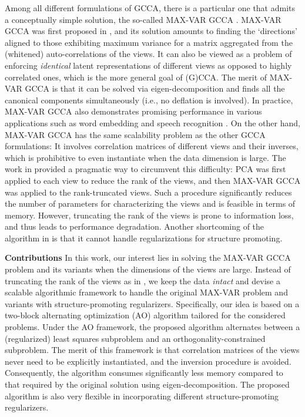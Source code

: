 \documentclass[10pt,journal]{IEEEtran}
\begin{document}
Among all different formulations of GCCA, there is a particular one that admits a conceptually simple solution, the so-called MAX-VAR GCCA \cite{carroll1968generalization,van2006generalized,kettenring1971canonical}.
MAX-VAR GCCA was first proposed in \cite{carroll1968generalization}, and its solution amounts to finding the `directions' aligned to those exhibiting maximum variance for a matrix aggregated from the (whitened) auto-correlations of the views.
It can also be viewed as a problem of enforcing {\em identical} latent representations of different views as opposed to highly correlated ones, which is the more general goal of (G)CCA.
The merit of MAX-VAR GCCA is that it can be solved via eigen-decomposition
and finds all the canonical components simultaneously (i.e., no deflation is involved).
In practice, MAX-VAR GCCA also demonstrates promising performance in various applications such as word embedding \cite{rastogimultiview} and speech recognition \cite{arora2014multi}.
On the other hand, MAX-VAR GCCA has the same scalability problem as the other GCCA formulations:
It involves correlation matrices of different views and their inverses, which is prohibitive to even instantiate when the data dimension is large.
The work in \cite{rastogimultiview} provided a pragmatic way to circumvent this difficulty: PCA was first applied to each view to reduce the rank of the views,
and then MAX-VAR GCCA was applied to the rank-truncated views. Such a procedure significantly reduces
the number of parameters for characterizing the views and is feasible in terms of memory. However, truncating the rank of the views is prone to information loss, and thus leads to performance degradation.
Another shortcoming of the algorithm in \cite{rastogimultiview} is that it cannot handle regularizations for structure promoting.

\bigskip

\noindent
{\bf Contributions}
In this work, our interest lies in solving the MAX-VAR GCCA problem and its variants when the dimensions of the views are large.
Instead of truncating the rank of the views as in \cite{rastogimultiview}, we keep the data \emph{intact} and devise a scalable algorithmic framework to handle the original MAX-VAR problem
and variants with structure-promoting regularizers.
Specifically, our idea is based on a two-block alternating optimization (AO) algorithm tailored for the considered problems.
Under the AO framework, the proposed algorithm alternates between a (regularized) least squares subproblem and an orthogonality-constrained subproblem.
The merit of this framework is that correlation matrices of the views never need to be explicitly instantiated, and the inversion procedure is avoided. 
Consequently, the algorithm consumes significantly less memory compared to that required by the original solution using eigen-decomposition.
The proposed algorithm is also very flexible in incorporating different structure-promoting regularizers.
\end{document}
